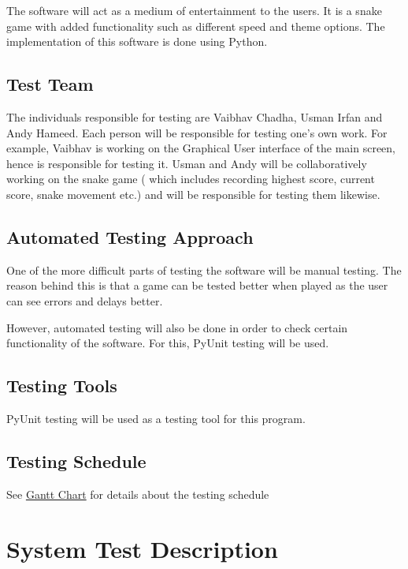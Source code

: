 \documentclass[12pt, titlepage]{article}
\begin{document}
The software will act as a medium of entertainment to the users. It is a snake game with added functionality such as different speed and theme options. The implementation of this software is done using Python. 

\subsection{Test Team}

The individuals responsible for testing are Vaibhav Chadha, Usman Irfan and Andy Hameed. Each person will be responsible for testing one's own work. For example, Vaibhav is working on the Graphical User interface of the main screen, hence is responsible for testing it. Usman and Andy will be collaboratively working on the snake game ( which includes recording highest score, current score, snake movement etc.) and will be responsible for testing them likewise.

\subsection{Automated Testing Approach}

One of the more difficult parts of testing the software will be manual testing. The reason behind this is that a game can be tested better when played as the user can see errors and delays better.

However, automated testing will also be done in order to check certain functionality of the software. For this, PyUnit testing will be used.

\subsection{Testing Tools}

PyUnit testing will be used as a testing tool for this program. 

\subsection{Testing Schedule}

See \href{https://gitlab.cas.mcmaster.ca/hameea1/se3xa3/tree/master/BlankProjectTemplate/ProjectSchedule}{Gantt Chart} for details about the testing schedule
	
\section{System Test Description}
	
\end{document}
